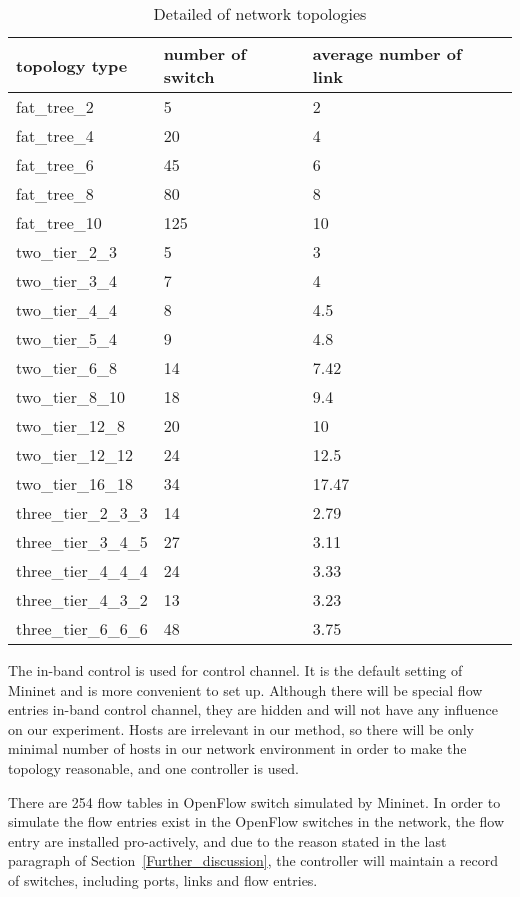 \begin{table}[H]
\centering
\caption{Detailed of network topologies}
\begin{tabular}{|l|l|l|l|}
\hline  topology type & number of switch & average number of link\\
\hline fat\_tree\_2 & 5 & 2 \\
\hline fat\_tree\_4 & 20 & 4 \\
\hline fat\_tree\_6 & 45 & 6 \\
\hline fat\_tree\_8 & 80 & 8 \\
\hline fat\_tree\_10 & 125 & 10 \\
\hline two\_tier\_2\_3 & 5 & 3 \\
\hline two\_tier\_3\_4 & 7 & 4 \\
\hline two\_tier\_4\_4 & 8 & 4.5 \\
\hline two\_tier\_5\_4 & 9 & 4.8 \\
\hline two\_tier\_6\_8 & 14 & 7.42 \\
\hline two\_tier\_8\_10 & 18 & 9.4 \\
\hline two\_tier\_12\_8 & 20 & 10 \\
\hline two\_tier\_12\_12 & 24 & 12.5 \\
\hline two\_tier\_16\_18 & 34 & 17.47 \\
\hline three\_tier\_2\_3\_3 & 14 & 2.79 \\
\hline three\_tier\_3\_4\_5 & 27 & 3.11 \\
\hline three\_tier\_4\_4\_4 & 24 & 3.33 \\
\hline three\_tier\_4\_3\_2 & 13 & 3.23 \\
\hline three\_tier\_6\_6\_6 & 48 & 3.75 \\
\hline 
\end{tabular}
\label{table:network_env}
\end{table}

The in-band control is used for control channel. It is the default setting of Mininet and is more convenient to set up. Although there will be special flow entries in-band control channel, they are hidden and will not have any influence on our experiment. Hosts are irrelevant in our method, so there will be only minimal number of hosts in our network environment in order to make the topology reasonable, and one controller is used. 

There are 254 flow tables in OpenFlow switch simulated by Mininet. In order to simulate the flow entries exist in the OpenFlow switches in the network, the flow entry are installed pro-actively, and due to the reason stated in the last paragraph of Section~\ref{Further_discussion}, the controller will maintain a record of switches, including ports, links and flow entries. 

